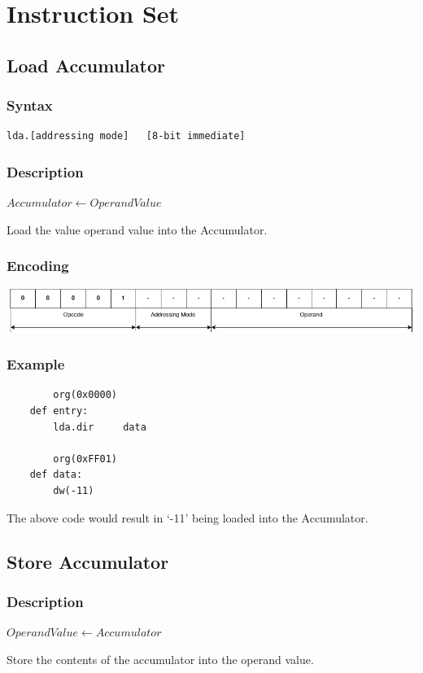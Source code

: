 \section{Instruction Set}\label{sec:instruction-set}
\subsection{Load Accumulator}\label{subsec:lda}
    \subsubsection{Syntax}
    \begin{verbatim}lda.[addressing mode]   [8-bit immediate] \end{verbatim}
    \subsubsection{Description}
    $Accumulator \leftarrow OperandValue$
    \par Load the value operand value into the Accumulator.

    \subsubsection{Encoding}
    \begin{center}
        \includegraphics[scale=0.40]{img/Andromeda-LDA.drawio}
    \end{center}

    \subsubsection{Example}
    \begin{verbatim}
        org(0x0000)
    def entry:
        lda.dir     data

        org(0xFF01)
    def data:
        dw(-11)
    \end{verbatim}
    \par The above code would result in `-11' being loaded into the Accumulator.

\pagebreak
\subsection{Store Accumulator}\label{subsec:sta}
    \subsubsection{Description}
    $OperandValue \leftarrow Accumulator $ \\
    \par Store the contents of the accumulator into the operand value.

